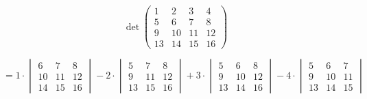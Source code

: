 \documentclass[12pt]{article}
\begin{document}
\begin{center}

$$ \det\begin{pmatrix} 1 & 2 & 3 & 4 \\ 5 & 6 & 7 & 8 \\ 9 & 10 & 11 & 12 \\ 13 & 14 & 15 & 16 \end{pmatrix} $$

$$
= 1 \cdot \begin{vmatrix} 6 & 7 & 8 \\ 10 & 11 & 12 \\ 14 & 15 & 16 \end{vmatrix}
- 2 \cdot \begin{vmatrix} 5 & 7 & 8 \\ 9 & 11 & 12 \\ 13 & 15 & 16 \end{vmatrix}
+ 3 \cdot \begin{vmatrix} 5 & 6 & 8 \\ 9 & 10 & 12 \\ 13 & 14 & 16 \end{vmatrix}
- 4 \cdot \begin{vmatrix} 5 & 6 & 7 \\ 9 & 10 & 11 \\ 13 & 14 & 15 \end{vmatrix}
$$


\end{center}
\end{document}
